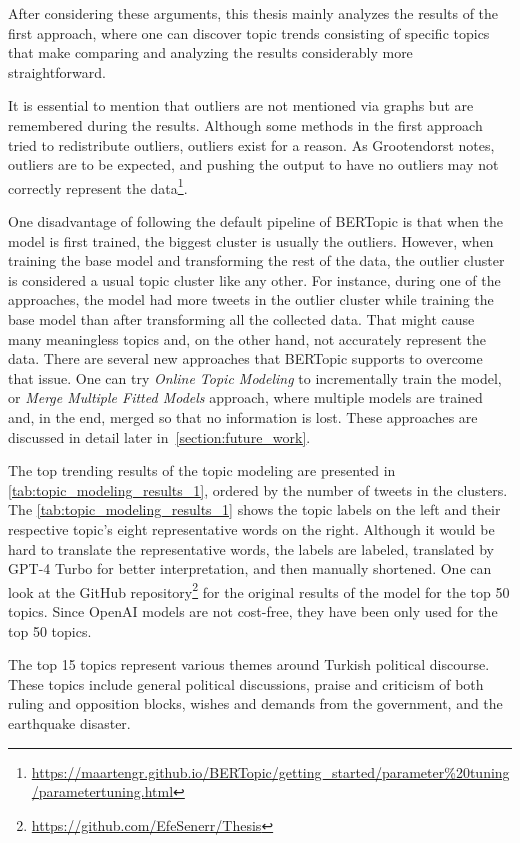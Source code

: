 After considering these arguments, this thesis mainly analyzes the results of the first approach, 
where one can discover topic trends consisting of specific topics that make comparing and analyzing 
the results considerably more straightforward.

It is essential to mention that outliers are not mentioned via graphs but are remembered 
during the results. Although some methods in the first approach tried to redistribute outliers, outliers 
exist for a reason. As Grootendorst notes, 
outliers are to be expected, and pushing the 
output to have no outliers may not correctly represent the data\footnote{\url{https://maartengr.github.io/BERTopic/getting_started/parameter\%20tuning/parametertuning.html}}. 

One disadvantage of following the default pipeline of BERTopic is that when the model is first trained, 
the biggest cluster is usually the outliers. However, when training the base model and transforming 
the rest of the data, the outlier cluster is considered a usual topic cluster like any other. 
For instance, during one of the approaches, the model had more tweets in the outlier cluster 
while training the base model than after transforming all the collected data. That might cause many 
meaningless topics and, on the other hand, not accurately represent the data. 
There are several new approaches that BERTopic supports to overcome that issue. 
One can try \textit{Online Topic Modeling} to incrementally train the model, or 
\textit{Merge Multiple Fitted Models} approach, where multiple models are trained and, in the end, 
merged so that no information is lost. These approaches are discussed in detail later in~\autoref{section:future_work}.
% 

The top trending results of the topic modeling are presented in \autoref{tab:topic_modeling_results_1}, 
ordered by the number of tweets in the clusters. The \autoref{tab:topic_modeling_results_1} shows 
the topic labels on the left and their respective topic's eight representative words on the right. 
Although it would be hard to translate the representative words, the labels are labeled,
translated by GPT-4 Turbo for better interpretation, and then manually shortened. One can look at the 
GitHub repository\footnote{\url{https://github.com/EfeSenerr/Thesis}} 
for the original results of the model for the top 50 topics. Since OpenAI models are not cost-free, 
they have been only used for the top 50 topics.

The top 15 topics represent various themes around Turkish political discourse. These topics include 
general political discussions, praise and criticism of both ruling and opposition blocks, 
wishes and demands from the government, and the earthquake disaster. 

